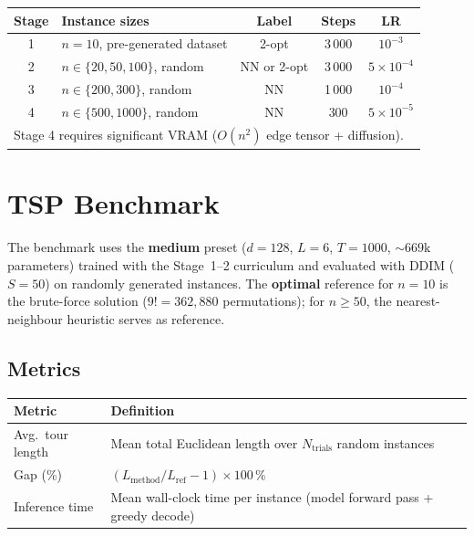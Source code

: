 \documentclass[12pt,a4paper]{article}
\begin{document}
\begin{center}
\begin{tabularx}{\linewidth}{c>{\raggedright\arraybackslash}Xccc}
\toprule
\textbf{Stage} & \textbf{Instance sizes} & \textbf{Label} &
  \textbf{Steps} & \textbf{LR} \\
\midrule
1 & $n=10$, pre-generated dataset & 2-opt & 3\,000 & $10^{-3}$ \\
2 & $n\in\{20,50,100\}$, random & NN or 2-opt & 3\,000 & $5\!\times\!10^{-4}$ \\
3 & $n\in\{200,300\}$, random & NN & 1\,000 & $10^{-4}$ \\
4 & $n\in\{500,1000\}$, random & NN & 300 & $5\!\times\!10^{-5}$ \\
\bottomrule
\multicolumn{5}{l}{\small Stage 4 requires significant VRAM ($O(n^2)$
  edge tensor + diffusion).}\\
\end{tabularx}
\end{center}

\section{TSP Benchmark}

The benchmark uses the \textbf{medium} preset ($d=128$, $L=6$, $T=1000$,
${\sim}669\mathrm{k}$ parameters) trained with the Stage~1--2 curriculum
and evaluated with DDIM ($S=50$) on randomly generated instances.
The \textbf{optimal} reference for $n=10$ is the brute-force solution
($9! = 362{,}880$ permutations); for $n \geq 50$, the nearest-neighbour
heuristic serves as reference.

\subsection*{Metrics}

\begin{center}
\begin{tabular}{lp{10cm}}
\toprule
\textbf{Metric} & \textbf{Definition} \\
\midrule
Avg.\ tour length & Mean total Euclidean length over $N_{\mathrm{trials}}$ random instances \\
Gap (\%) & $(L_{\mathrm{method}} / L_{\mathrm{ref}} - 1) \times 100\,\%$ \\
Inference time & Mean wall-clock time per instance (model forward pass
  + greedy decode) \\
\bottomrule
\end{tabular}
\end{center}
\end{document}
